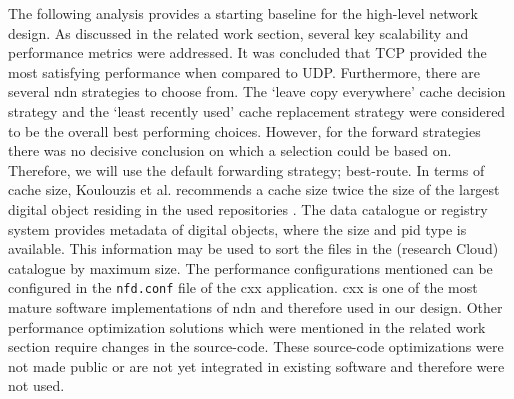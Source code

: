 \documentclass[conference]{IEEEtran}
\begin{document}

The following analysis provides a starting baseline for the high-level network design. As discussed in the related work section, several key scalability and performance metrics were addressed. It was concluded that TCP provided the most satisfying performance when compared to UDP. Furthermore, there are several \gls{ndn} strategies to choose from. The `leave copy everywhere' cache decision strategy and the `least recently used' cache replacement strategy were considered to be the overall best performing choices. However, for the forward strategies there was no decisive conclusion on which a selection could be based on. Therefore, we will use the default forwarding strategy; best-route. In terms of cache size, Koulouzis et al. recommends a cache size twice the size of the largest digital object residing in the used repositories \cite{koulouzis2018information}. The data catalogue or registry system provides metadata of digital objects, where the size and \gls{pid} type is available. This information may be used to sort the files in the (research Cloud) catalogue by maximum size. The performance configurations mentioned can be configured in the \texttt{nfd.conf} file of the \gls{cxx} application. \gls{cxx} is one of the most mature software implementations of \gls{ndn} and therefore used in our design. Other performance optimization solutions which were mentioned in the related work section require changes in the source-code. These source-code optimizations were not made public or are not yet integrated in existing software and therefore were not used.
\end{document}
